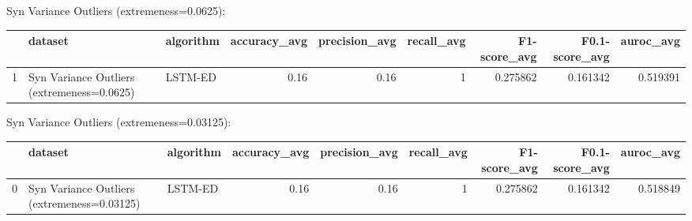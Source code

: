 Syn Variance Outliers (extremeness=0.0625):

\begin{tabular}{rllrrrrrr}
\hline
    & dataset                                    & algorithm   &   accuracy\_avg &   precision\_avg &   recall\_avg &   F1-score\_avg &   F0.1-score\_avg &   auroc\_avg \\
\hline
  1 & Syn Variance Outliers (extremeness=0.0625) & LSTM-ED     &           0.16 &            0.16 &            1 &       0.275862 &         0.161342 &    0.519391 \\
\hline
\end{tabular}

Syn Variance Outliers (extremeness=0.03125):

\begin{tabular}{rllrrrrrr}
\hline
    & dataset                                     & algorithm   &   accuracy\_avg &   precision\_avg &   recall\_avg &   F1-score\_avg &   F0.1-score\_avg &   auroc\_avg \\
\hline
  0 & Syn Variance Outliers (extremeness=0.03125) & LSTM-ED     &           0.16 &            0.16 &            1 &       0.275862 &         0.161342 &    0.518849 \\
\hline
\end{tabular}

